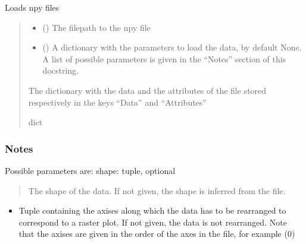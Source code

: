 \documentclass[letterpaper,10pt,english]{sphinxmanual}
\begin{document}
\begin{fulllineitems}
\label{\detokenize{_autosummary/HDF5_BLS.load_formats.load_sif:HDF5_BLS.load_formats.load_sif.load_sif_base}}
\pysigstartsignatures
\pysiglinewithargsret
{}
{\sphinxparamcomma {}}
{}
\pysigstopsignatures
\sphinxAtStartPar
Loads npy files
\begin{quote}\begin{description}
\begin{itemize}
\item {} 
\sphinxAtStartPar
{} () \textendash{} The filepath to the npy file

\item {} 
\sphinxAtStartPar
{} (\sphinxstyleliteralemphasis{\sphinxupquote{, }}) \textendash{} A dictionary with the parameters to load the data, by default None. A list of possible parameters is given in the “Notes” section of this docstring.

\end{itemize}

\sphinxAtStartPar
The dictionary with the data and the attributes of the file stored respectively in the keys “Data” and “Attributes”

\sphinxAtStartPar
dict

\end{description}\end{quote}
\subsubsection*{Notes}

\sphinxAtStartPar
Possible parameters are:
\sphinxhyphen{} shape: tuple, optional
\begin{quote}

\sphinxAtStartPar
The shape of the data. If not given, the shape is inferred from the file.
\end{quote}
\begin{itemize}
\item {} \begin{description}
\sphinxAtStartPar
Tuple containing the axises along which the data has to be rearranged to correspond to a raster plot. If not given, the data is not rearranged. Note that the axises are given in the order of the axes in the file, for example (0)

\end{description}

\end{itemize}

\end{fulllineitems}
\end{document}
